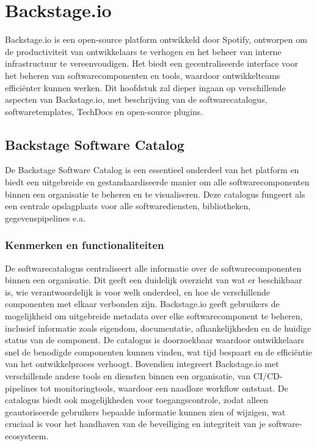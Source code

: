 \chapter{Backstage.io}
\label{ch:Backstage}

Backstage.io is een open-source platform ontwikkeld door Spotify, ontworpen om de productiviteit van ontwikkelaars te verhogen en het beheer van interne infrastructuur te vereenvoudigen. Het biedt een gecentraliseerde interface voor het beheren van softwarecomponenten en tools, waardoor ontwikkelteams efficiënter kunnen werken. Dit hoofdstuk zal dieper ingaan op verschillende aspecten van Backstage.io, met beschrijving van de softwarecatalogus, softwaretemplates, TechDocs en open-source plugins.

\section{Backstage Software Catalog}

De Backstage Software Catalog is een essentieel onderdeel van het platform en biedt een uitgebreide en gestandaardiseerde manier om alle softwarecomponenten binnen een organisatie te beheren en te visualiseren. Deze catalogus fungeert als een centrale opslagplaats voor alle softwarediensten, bibliotheken, gegevenspipelines e.a.

\subsection{Kenmerken en functionaliteiten}

De softwarecatalogus centraliseert alle informatie over de softwarecomponenten binnen een organisatie. Dit geeft een duidelijk overzicht van wat er beschikbaar is, wie verantwoordelijk is voor welk onderdeel, en hoe de verschillende componenten met elkaar verbonden zijn. Backstage.io geeft gebruikers de mogelijkheid om uitgebreide metadata over elke softwarecomponent te beheren, inclusief informatie zoals eigendom, documentatie, afhankelijkheden en de huidige status van de component. De catalogus is doorzoekbaar waardoor ontwikkelaars snel de benodigde componenten kunnen vinden, wat tijd bespaart en de efficiëntie van het ontwikkelproces verhoogt. Bovendien integreert Backstage.io met verschillende andere tools en diensten binnen een organisatie, van CI/CD-pipelines tot monitoringtools, waardoor een naadloze workflow ontstaat. De catalogus biedt ook mogelijkheden voor toegangscontrole, zodat alleen geautoriseerde gebruikers bepaalde informatie kunnen zien of wijzigen, wat cruciaal is voor het handhaven van de beveiliging en integriteit van je software-ecosysteem.

